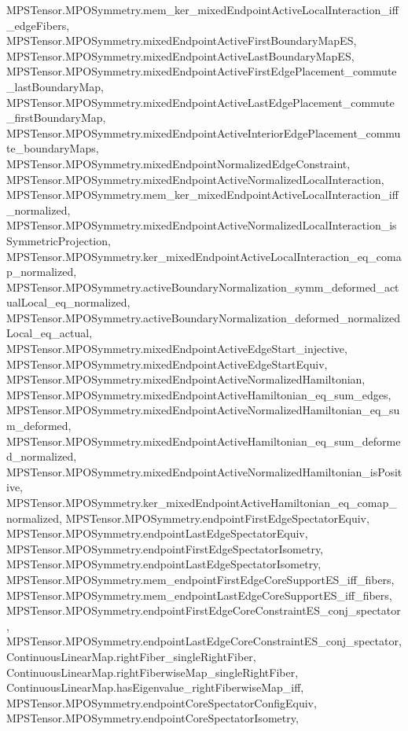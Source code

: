 \begin{lemma}
{        MPSTensor.MPOSymmetry.mem_ker_mixedEndpointActiveLocalInteraction_iff_edgeFibers,
        MPSTensor.MPOSymmetry.mixedEndpointActiveFirstBoundaryMapES,
        MPSTensor.MPOSymmetry.mixedEndpointActiveLastBoundaryMapES,
        MPSTensor.MPOSymmetry.mixedEndpointActiveFirstEdgePlacement_commute_lastBoundaryMap,
        MPSTensor.MPOSymmetry.mixedEndpointActiveLastEdgePlacement_commute_firstBoundaryMap,
        MPSTensor.MPOSymmetry.mixedEndpointActiveInteriorEdgePlacement_commute_boundaryMaps,
        MPSTensor.MPOSymmetry.mixedEndpointNormalizedEdgeConstraint,
        MPSTensor.MPOSymmetry.mixedEndpointActiveNormalizedLocalInteraction,
        MPSTensor.MPOSymmetry.mem_ker_mixedEndpointActiveLocalInteraction_iff_normalized,
        MPSTensor.MPOSymmetry.mixedEndpointActiveNormalizedLocalInteraction_isSymmetricProjection,
        MPSTensor.MPOSymmetry.ker_mixedEndpointActiveLocalInteraction_eq_comap_normalized,
        MPSTensor.MPOSymmetry.activeBoundaryNormalization_symm_deformed_actualLocal_eq_normalized,
        MPSTensor.MPOSymmetry.activeBoundaryNormalization_deformed_normalizedLocal_eq_actual,
        MPSTensor.MPOSymmetry.mixedEndpointActiveEdgeStart_injective,
        MPSTensor.MPOSymmetry.mixedEndpointActiveEdgeStartEquiv,
        MPSTensor.MPOSymmetry.mixedEndpointActiveNormalizedHamiltonian,
        MPSTensor.MPOSymmetry.mixedEndpointActiveHamiltonian_eq_sum_edges,
        MPSTensor.MPOSymmetry.mixedEndpointActiveNormalizedHamiltonian_eq_sum_deformed,
        MPSTensor.MPOSymmetry.mixedEndpointActiveHamiltonian_eq_sum_deformed_normalized,
        MPSTensor.MPOSymmetry.mixedEndpointActiveNormalizedHamiltonian_isPositive,
        MPSTensor.MPOSymmetry.ker_mixedEndpointActiveHamiltonian_eq_comap_normalized,
        MPSTensor.MPOSymmetry.endpointFirstEdgeSpectatorEquiv,
        MPSTensor.MPOSymmetry.endpointLastEdgeSpectatorEquiv,
        MPSTensor.MPOSymmetry.endpointFirstEdgeSpectatorIsometry,
        MPSTensor.MPOSymmetry.endpointLastEdgeSpectatorIsometry,
        MPSTensor.MPOSymmetry.mem_endpointFirstEdgeCoreSupportES_iff_fibers,
        MPSTensor.MPOSymmetry.mem_endpointLastEdgeCoreSupportES_iff_fibers,
        MPSTensor.MPOSymmetry.endpointFirstEdgeCoreConstraintES_conj_spectator,
        MPSTensor.MPOSymmetry.endpointLastEdgeCoreConstraintES_conj_spectator,
        ContinuousLinearMap.rightFiber_singleRightFiber,
        ContinuousLinearMap.rightFiberwiseMap_singleRightFiber,
        ContinuousLinearMap.hasEigenvalue_rightFiberwiseMap_iff,
        MPSTensor.MPOSymmetry.endpointCoreSpectatorConfigEquiv,
        MPSTensor.MPOSymmetry.endpointCoreSpectatorIsometry,
}
\end{lemma}
